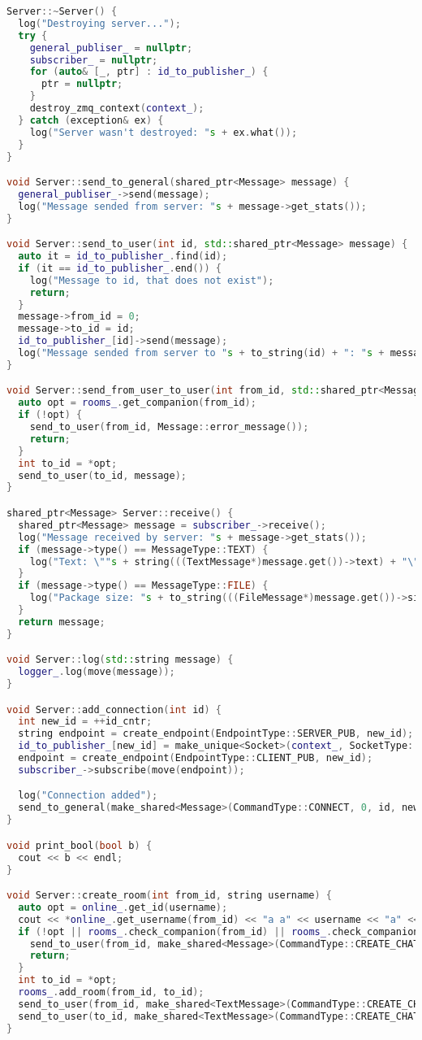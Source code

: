 \begin{lstlisting}[language=C++]
Server::~Server() {
  log("Destroying server...");
  try {
    general_publiser_ = nullptr;
    subscriber_ = nullptr;
    for (auto& [_, ptr] : id_to_publisher_) {
      ptr = nullptr;
    }
    destroy_zmq_context(context_);
  } catch (exception& ex) {
    log("Server wasn't destroyed: "s + ex.what());
  }
}

void Server::send_to_general(shared_ptr<Message> message) {
  general_publiser_->send(message);
  log("Message sended from server: "s + message->get_stats());
}

void Server::send_to_user(int id, std::shared_ptr<Message> message) {
  auto it = id_to_publisher_.find(id);
  if (it == id_to_publisher_.end()) {
    log("Message to id, that does not exist");
    return;
  }
  message->from_id = 0;
  message->to_id = id;
  id_to_publisher_[id]->send(message);
  log("Message sended from server to "s + to_string(id) + ": "s + message->get_stats());
}

void Server::send_from_user_to_user(int from_id, std::shared_ptr<Message> message) {
  auto opt = rooms_.get_companion(from_id);
  if (!opt) {
    send_to_user(from_id, Message::error_message());
    return;
  }
  int to_id = *opt;
  send_to_user(to_id, message);
}

shared_ptr<Message> Server::receive() {
  shared_ptr<Message> message = subscriber_->receive();
  log("Message received by server: "s + message->get_stats());
  if (message->type() == MessageType::TEXT) {
    log("Text: \""s + string(((TextMessage*)message.get())->text) + "\""s);
  }
  if (message->type() == MessageType::FILE) {
    log("Package size: "s + to_string(((FileMessage*)message.get())->size));
  }
  return message;
}

void Server::log(std::string message) {
  logger_.log(move(message));
}

void Server::add_connection(int id) {
  int new_id = ++id_cntr;
  string endpoint = create_endpoint(EndpointType::SERVER_PUB, new_id);
  id_to_publisher_[new_id] = make_unique<Socket>(context_, SocketType::PUBLISHER, move(endpoint));
  endpoint = create_endpoint(EndpointType::CLIENT_PUB, new_id);
  subscriber_->subscribe(move(endpoint));

  log("Connection added");
  send_to_general(make_shared<Message>(CommandType::CONNECT, 0, id, new_id));
}

void print_bool(bool b) {
  cout << b << endl;
}

void Server::create_room(int from_id, string username) {
  auto opt = online_.get_id(username);
  cout << *online_.get_username(from_id) << "a a" << username << "a" << endl;
  if (!opt || rooms_.check_companion(from_id) || rooms_.check_companion(*opt) || *online_.get_username(from_id) == username) {
    send_to_user(from_id, make_shared<Message>(CommandType::CREATE_CHAT, 0, from_id, 0));
    return;
  }
  int to_id = *opt;
  rooms_.add_room(from_id, to_id);
  send_to_user(from_id, make_shared<TextMessage>(CommandType::CREATE_CHAT, 0, from_id, *online_.get_username(to_id), 1));
  send_to_user(to_id, make_shared<TextMessage>(CommandType::CREATE_CHAT, 0, to_id, *online_.get_username(from_id), 1));
}


\end{lstlisting}
